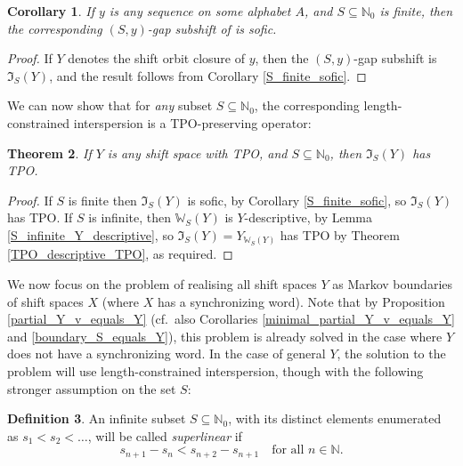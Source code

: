 \documentclass[reqno,11pt]{amsart}
\newtheorem{thm}{Theorem}[section]
\newtheorem{cor}[thm]{Corollary}
\theoremstyle{definition}
\newtheorem{defn}[thm]{Definition}
\theoremstyle{remark}
\theoremstyle{remark}
\def \N {\mathbb N}
\def\w{\mathbb{W}}
\def\i{\mathfrak{I}}
\numberwithin{equation}{section}
\begin{document}
\begin{cor}
If $y$ is any sequence on some alphabet $A$, and $S\subseteq\N_0$ is finite, 
then the corresponding $(S,y)$-gap subshift of \cite{RS25} is sofic.
\end{cor}
\begin{proof}
If $Y$ denotes the shift orbit closure of $y$, then the $(S,y)$-gap subshift is $\i_S(Y)$,
and the result follows from Corollary \ref{S_finite_sofic}.
\end{proof}


We can now show that for \emph{any} subset $S\subseteq \N_0$, the corresponding length-constrained interspersion is a TPO-preserving operator:

\begin{thm}\label{TPO_descriptive_TPO_S_infinite}
If $Y$ is any shift space with TPO, and $S\subseteq\N_0$,
then $\i_S(Y)$ has TPO.
\end{thm}
\begin{proof}
If $S$ is finite then $\i_S(Y)$ is sofic, by Corollary \ref{S_finite_sofic}, so $\i_S(Y)$ has TPO.
If $S$ is infinite, then $\w_S(Y)$ is $Y$-descriptive,
by Lemma \ref{S_infinite_Y_descriptive},
so $\i_S(Y)=Y_{\w_S(Y)}$
has TPO by Theorem \ref{TPO_descriptive_TPO}, as required.
\end{proof}




We now focus on the problem of realising all shift spaces $Y$ as Markov boundaries
of shift spaces $X$ (where $X$ has a synchronizing word).
Note that by
Proposition \ref{partial_Y_v_equals_Y}
(cf.~also Corollaries \ref{minimal_partial_Y_v_equals_Y} and \ref{boundary_S_equals_Y}),
this problem is already solved in the case where $Y$ does not have a synchronizing word.
In the case of general $Y$, the solution to the problem will use length-constrained interspersion, though with the following stronger assumption on the set $S$:

\begin{defn}
An infinite subset $S\subseteq\N_0$,
with its distinct elements
enumerated as $s_1<s_2<\ldots$,
will be called \emph{superlinear} if
\begin{equation}\label{differences}
s_{n+1} - s_n < s_{n+2} - s_{n+1}\quad\text{for all }n\in\N.
\end{equation}
\end{defn}
\end{document}
